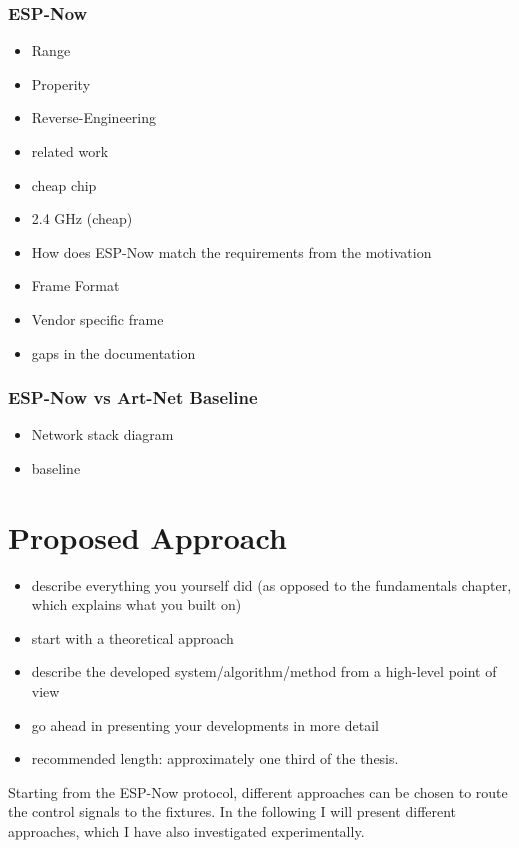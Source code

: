 \documentclass[]{ccs-thesis}
\begin{document}
\subsection*{ESP-Now}
\begin{itemize}
\item Range
\item Properity
\item Reverse-Engineering 
\item related work
\item cheap chip
\item 2.4 GHz (cheap)
\item How does ESP-Now match the requirements from the motivation
\item Frame Format
\item Vendor specific frame
\item gaps in the documentation
\end{itemize}

\subsection{ESP-Now vs Art-Net Baseline}
\begin{itemize}
\item Network stack diagram
\item baseline
\end{itemize}

\chapter{Proposed Approach}
\begin{itemize}
\item describe everything you yourself did (as opposed to the fundamentals chapter, which explains what you built on)
\item start with a theoretical approach
\item describe the developed system/algorithm/method from a high-level point of view
\item go ahead in presenting your developments in more detail
\item recommended length: approximately one third of the thesis.
\end{itemize}

Starting from the ESP-Now protocol, different approaches can be chosen to route the control signals to the fixtures. 
In the following I will present different approaches, which I have also investigated experimentally.
\end{document}
